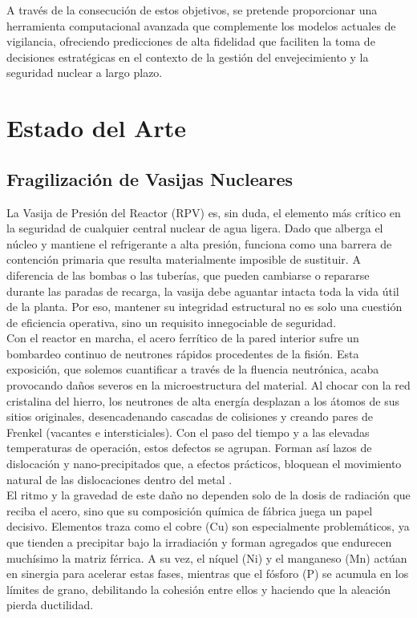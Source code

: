 \documentclass[a4paper, 12pt, twocolumn]{book}
\begin{document}
A través de la consecución de estos objetivos, se pretende proporcionar una herramienta computacional avanzada que complemente los modelos actuales de vigilancia, ofreciendo predicciones de alta fidelidad que faciliten la toma de decisiones estratégicas en el contexto de la gestión del envejecimiento y la seguridad nuclear a largo plazo.

\chapter{Estado del Arte}

\section{Fragilización de Vasijas Nucleares}

La Vasija de Presión del Reactor (RPV) es, sin duda, el elemento más crítico en la seguridad de cualquier central nuclear de agua ligera. Dado que alberga el núcleo y mantiene el refrigerante a alta presión, funciona como una barrera de contención primaria que resulta materialmente imposible de sustituir. A diferencia de las bombas o las tuberías, que pueden cambiarse o repararse durante las paradas de recarga, la vasija debe aguantar intacta toda la vida útil de la planta. Por eso, mantener su integridad estructural no es solo una cuestión de eficiencia operativa, sino un requisito innegociable de seguridad.\\

Con el reactor en marcha, el acero ferrítico de la pared interior sufre un bombardeo continuo de neutrones rápidos procedentes de la fisión. Esta exposición, que solemos cuantificar a través de la fluencia neutrónica, acaba provocando daños severos en la microestructura del material. Al chocar con la red cristalina del hierro, los neutrones de alta energía desplazan a los átomos de sus sitios originales, desencadenando cascadas de colisiones y creando pares de Frenkel (vacantes e intersticiales). Con el paso del tiempo y a las elevadas temperaturas de operación, estos defectos se agrupan. Forman así lazos de dislocación y nano-precipitados que, a efectos prácticos, bloquean el movimiento natural de las dislocaciones dentro del metal \parencite{bonny2013}.\\

El ritmo y la gravedad de este daño no dependen solo de la dosis de radiación que reciba el acero, sino que su composición química de fábrica juega un papel decisivo. Elementos traza como el cobre (Cu) son especialmente problemáticos, ya que tienden a precipitar bajo la irradiación y forman agregados que endurecen muchísimo la matriz férrica. A su vez, el níquel (Ni) y el manganeso (Mn) actúan en sinergia para acelerar estas fases, mientras que el fósforo (P) se acumula en los límites de grano, debilitando la cohesión entre ellos y haciendo que la aleación pierda ductilidad.\\
\end{document}
